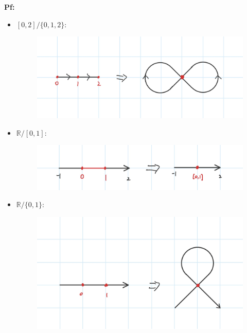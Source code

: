 \documentclass{article}
\begin{document}
\textbf{Pf:}

\begin{itemize}
    \item $[0,2]/\{0,1,2\}$:
    
    \begin{figure}[h!]
        \begin{center}
            \includegraphics*[width=120mm]{1.jpg}
        \end{center}
    \end{figure}

    \hfil

    \item $\mathbb{R}/[0,1]$:
    
    \begin{figure}[h!]
        \begin{center}
            \includegraphics*[width=120mm]{2.jpg}
        \end{center}
    \end{figure}

    \break

    \item $\mathbb{R}/\{0,1\}$:
    
    \begin{figure}[h!]
        \begin{center}
            \includegraphics*[width=120mm]{3.jpg}
        \end{center}
    \end{figure}


\end{itemize}
\end{document}
